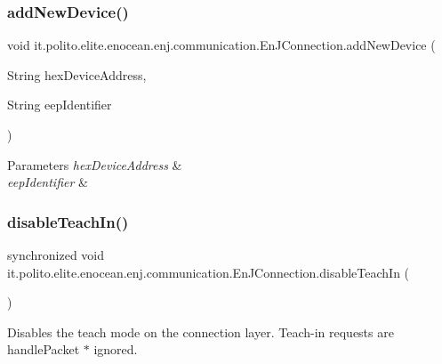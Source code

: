 \subsubsection{\texorpdfstring{add\+New\+Device()}{addNewDevice()}}
{\footnotesize\ttfamily void it.\+polito.\+elite.\+enocean.\+enj.\+communication.\+En\+J\+Connection.\+add\+New\+Device (\begin{DoxyParamCaption}\item[{String}]{hex\+Device\+Address,  }\item[{String}]{eep\+Identifier }\end{DoxyParamCaption})}


\begin{DoxyParams}{Parameters}
{\em hex\+Device\+Address} & \\
\hline
{\em eep\+Identifier} & \\
\hline
\end{DoxyParams}
\hypertarget{classit_1_1polito_1_1elite_1_1enocean_1_1enj_1_1communication_1_1_en_j_connection_a59ed84d534b7cd0bd03466fdc54b5585}{}\label{classit_1_1polito_1_1elite_1_1enocean_1_1enj_1_1communication_1_1_en_j_connection_a59ed84d534b7cd0bd03466fdc54b5585} 
\subsubsection{\texorpdfstring{disable\+Teach\+In()}{disableTeachIn()}}
{\footnotesize\ttfamily synchronized void it.\+polito.\+elite.\+enocean.\+enj.\+communication.\+En\+J\+Connection.\+disable\+Teach\+In (\begin{DoxyParamCaption}{ }\end{DoxyParamCaption})}

Disables the teach mode on the connection layer. Teach-\/in requests are handle\+Packet $\ast$ ignored. \hypertarget{classit_1_1polito_1_1elite_1_1enocean_1_1enj_1_1communication_1_1_en_j_connection_a6b7c48b7500c28ec6afbf1840031b3ee}{}\label{classit_1_1polito_1_1elite_1_1enocean_1_1enj_1_1communication_1_1_en_j_connection_a6b7c48b7500c28ec6afbf1840031b3ee} 
